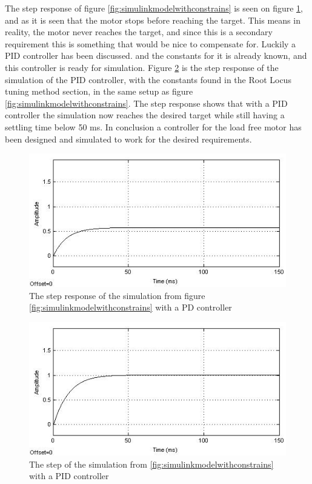 The step response of figure \ref{fig:simulinkmodelwithconstrains} is seen on figure \ref{fig:SimuStepPDWithConstrains}, and as it is seen that the motor stops before reaching the target. This means in reality, the motor never reaches the target, and since this is a secondary requirement this is something that would be nice to compensate for. Luckily a PID controller has been discussed. and the constants for it is already known, and this controller is ready for simulation. Figure \ref{fig:SimuStepPIDWithConstrains} is the step response of the simulation of the PID controller, with the constants found in the Root Locus tuning method section, in the same setup as figure \ref{fig:simulinkmodelwithconstrains}. The step response shows that with a PID controller the simulation now reaches the desired target while still having a settling time below 50 ms. In conclusion a controller for the load free motor has been designed and simulated to work for the desired requirements.


\begin{figure}[h!]
\centering
\includegraphics[scale=0.7]{Billeder/SimuStepPDWithConstrains.jpg}
\caption{ The step response of  the simulation from figure \ref{fig:simulinkmodelwithconstrains} with a PD controller }
\label{fig:SimuStepPDWithConstrains}
\end{figure}


\begin{figure}[h!]
\centering
\includegraphics[scale=0.7]{Billeder/SimuStepPIDWithConstrains.jpg}
\caption{ The step of the simulation from \ref{fig:simulinkmodelwithconstrains} with a PID controller }
\label{fig:SimuStepPIDWithConstrains}
\end{figure}

